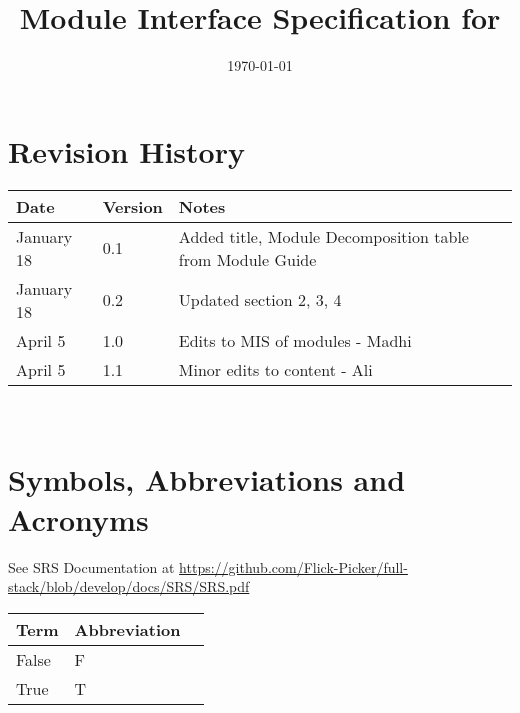 \documentclass[12pt, titlepage]{article}
\begin{document}
\title{Module Interface Specification for \progname{}}

\author{\authname}

\date{\today}

\maketitle


\section{Revision History}

\begin{tabularx}{\textwidth}{p{3cm}p{2cm}X}
\toprule {\bf Date} & {\bf Version} & {\bf Notes}\\
\midrule
January 18 & 0.1 & Added title, Module Decomposition table from Module Guide\\
January 18 & 0.2 & Updated section 2, 3, 4\\
April 5 & 1.0 &  Edits to MIS of modules - Madhi \\
April 5 & 1.1 & Minor edits to content - Ali \\
\bottomrule
\end{tabularx}

~\newpage

\section{Symbols, Abbreviations and Acronyms}

See SRS Documentation at \url{https://github.com/Flick-Picker/full-stack/blob/develop/docs/SRS/SRS.pdf}

\begin{center}
	
	\renewcommand{\arraystretch}{1.2}
	\noindent 
	\begin{tabular}{l l p{7.5cm}} 
		\toprule 
		\textbf{Term} & \textbf{Abbreviation}\\ 
		\midrule
		False & F\\
		True & T\\
		\bottomrule
	\end{tabular}
\end{center}





\newpage

\tableofcontents
\end{document}
